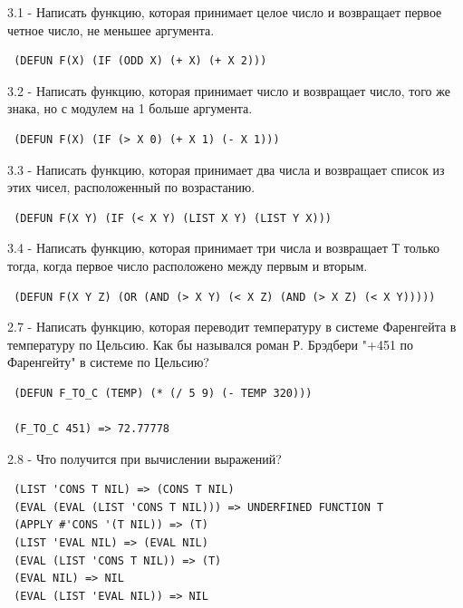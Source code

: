 3.1 - Написать функцию, которая принимает целое число и возвращает первое четное число, не меньшее аргумента.
 \begin{lstlisting}
 (DEFUN F(X) (IF (ODD X) (+ X) (+ X 2)))
\end{lstlisting}
3.2 - Написать функцию, которая принимает число и возвращает число, того же знака, но с модулем на 1 больше аргумента.
 \begin{lstlisting}
 (DEFUN F(X) (IF (> X 0) (+ X 1) (- X 1)))
\end{lstlisting}
3.3 - Написать функцию, которая принимает два числа и возвращает список из этих чисел, расположенный по возрастанию.
 \begin{lstlisting}
 (DEFUN F(X Y) (IF (< X Y) (LIST X Y) (LIST Y X)))
\end{lstlisting}
3.4 - Написать функцию, которая принимает три числа и возвращает Т только тогда, когда первое число расположено между первым и вторым.
 \begin{lstlisting}
 (DEFUN F(X Y Z) (OR (AND (> X Y) (< X Z) (AND (> X Z) (< X Y)))))
\end{lstlisting}
2.7 - Написать функцию, которая переводит температуру в системе Фаренгейта в температуру по Цельсию. Как бы назывался роман Р. Брэдбери "+451 по Фаренгейту" в системе по Цельсию? 
 \begin{lstlisting}
 (DEFUN F_TO_C (TEMP) (* (/ 5 9) (- TEMP 320)))

 (F_TO_C 451) => 72.77778
\end{lstlisting}
2.8 - Что получится при вычислении выражений?
 \begin{lstlisting}
 (LIST 'CONS T NIL) => (CONS T NIL)
 (EVAL (EVAL (LIST 'CONS T NIL))) => UNDERFINED FUNCTION T
 (APPLY #'CONS '(T NIL)) => (T)
 (LIST 'EVAL NIL) => (EVAL NIL)
 (EVAL (LIST 'CONS T NIL)) => (T)
 (EVAL NIL) => NIL
 (EVAL (LIST 'EVAL NIL)) => NIL
\end{lstlisting}
  